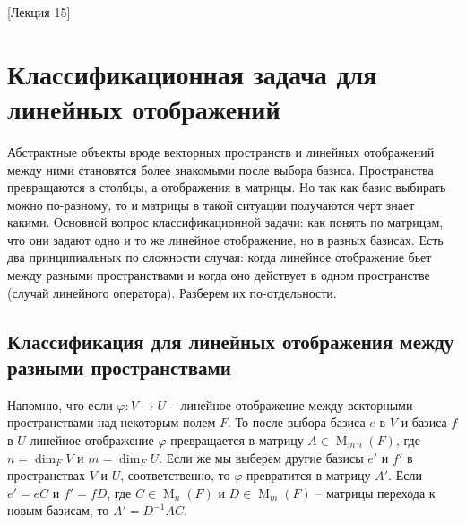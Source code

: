 [Лекция 15]

\newpage
\section{Классификационная задача для линейных отображений}

Абстрактные объекты вроде векторных пространств и линейных отображений между ними становятся более знакомыми после выбора базиса. Пространства превращаются в столбцы, а отображения в матрицы. Но так как базис выбирать можно по-разному, то и матрицы в такой ситуации получаются черт знает какими. Основной вопрос классификационной задачи: как понять по матрицам, что они задают одно и то же линейное отображение, но в разных базисах. Есть два принципиальных по сложности случая: когда линейное отображение бьет между разными пространствами и когда оно действует в одном пространстве (случай линейного оператора). Разберем их по-отдельности.

\subsection{Классификация для линейных отображения между разными пространствами}

Напомню, что если $\varphi \colon V\to U$ -- линейное отображение между векторными пространствами над некоторым полем $F$. То после выбора базиса $e$ в $V$ и базиса $f$ в $U$ линейное отображение $\varphi$ превращается в матрицу $A\in \operatorname{M}_{m\,n}(F)$, где $n = \dim_F V$ и $m = \dim_F U$. Если же мы выберем другие базисы $e'$ и $f'$ в пространствах $V$ и $U$, соответственно, то $\varphi$ превратится в матрицу $A'$. Если $e' = eC$ и $f' = fD$, где $C\in \operatorname{M}_n(F)$ и $D\in\operatorname{M}_m(F)$ -- матрицы перехода к новым базисам, то $A' = D^{-1}A C$.

